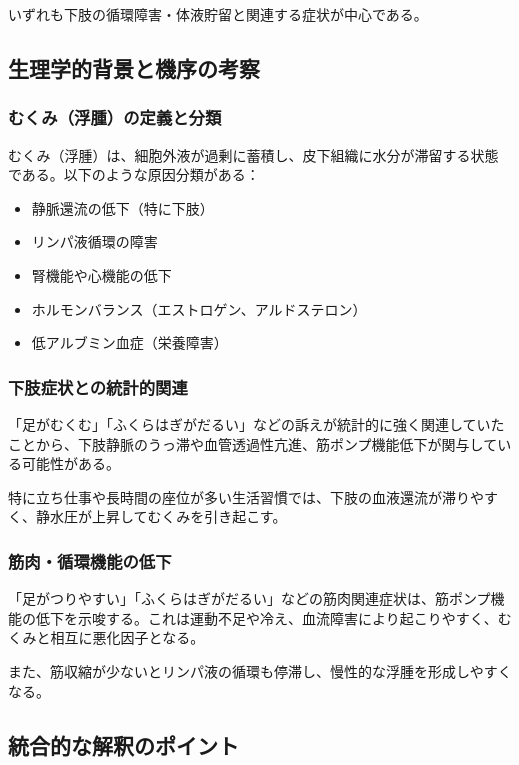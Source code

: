 \documentclass[a4paper,12pt]{article}
\begin{document}
いずれも下肢の循環障害・体液貯留と関連する症状が中心である。

\subsection*{生理学的背景と機序の考察}

\subsubsection*{むくみ（浮腫）の定義と分類}

むくみ（浮腫）は、細胞外液が過剰に蓄積し、皮下組織に水分が滞留する状態である。以下のような原因分類がある：

\begin{itemize}
  \item 静脈還流の低下（特に下肢）
  \item リンパ液循環の障害
  \item 腎機能や心機能の低下
  \item ホルモンバランス（エストロゲン、アルドステロン）
  \item 低アルブミン血症（栄養障害）
\end{itemize}

\subsubsection*{下肢症状との統計的関連}

「足がむくむ」「ふくらはぎがだるい」などの訴えが統計的に強く関連していたことから、下肢静脈のうっ滞や血管透過性亢進、筋ポンプ機能低下が関与している可能性がある。

特に立ち仕事や長時間の座位が多い生活習慣では、下肢の血液還流が滞りやすく、静水圧が上昇してむくみを引き起こす。

\subsubsection*{筋肉・循環機能の低下}

「足がつりやすい」「ふくらはぎがだるい」などの筋肉関連症状は、筋ポンプ機能の低下を示唆する。これは運動不足や冷え、血流障害により起こりやすく、むくみと相互に悪化因子となる。

また、筋収縮が少ないとリンパ液の循環も停滞し、慢性的な浮腫を形成しやすくなる。

\subsection*{統合的な解釈のポイント}
\end{document}
